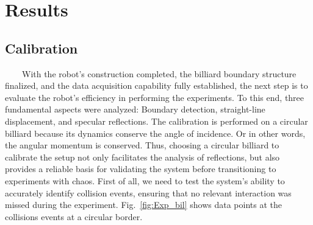 \documentclass[pdflatex,sn-mathphys-num,iicol]{sn-jnl}%
\theoremstyle{thmstyleone}%
\theoremstyle{thmstyletwo}%
\theoremstyle{thmstylethree}%
\begin{document}
\section{Results}

\subsection{\label{subsec:cali} Calibration}

\ \ \ \ With the robot's construction completed, the billiard boundary structure finalized, and the data acquisition capability fully established, the next step is to evaluate the robot's efficiency in performing the experiments. To this end, three fundamental aspects were analyzed: Boundary detection, straight-line displacement, and specular reflections. The calibration is performed on a circular billiard because its dynamics conserve the angle of incidence. Or in other words, the angular momentum is conserved. Thus, choosing a circular billiard to calibrate the setup not only facilitates the analysis of reflections, but also provides a reliable basis for validating the system before transitioning to experiments with chaos. First of all, we need to test the system's ability to accurately identify collision events, ensuring that no relevant interaction was missed during the experiment. Fig.~\ref{fig:Exp_bil} shows data points at the collisions events at a circular border.
\end{document}
